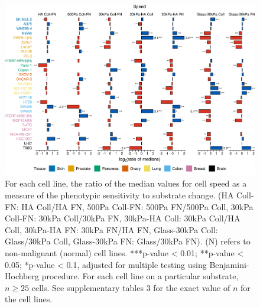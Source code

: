\documentclass[11pt,letterpaper,english,oneside]{article} %
\begin{document}
\begin{figure}[H]
    \centering
    \includegraphics{../Figures/Supplementary_Figure3/supplementary_figure3.png}
    \caption{For each cell line, the ratio of the median values for cell speed as a measure of the phenotypic sensitivity to substrate change. 
    (HA Coll-FN: HA Coll/HA FN, 500Pa Coll-FN: 500Pa FN/500Pa Coll, 30kPa Coll-FN: 30kPa Coll/30kPa FN, 30kPa-HA Coll: 30kPa Coll/HA Coll, 30kPa-HA FN: 30kPa FN/HA FN,
    Glass-30kPa Coll: Glass/30kPa Coll, Glass-30kPa FN: Glass/30kPa FN). (N) refers to non-malignant (normal) cell lines. 
    ***p-value < 0.01; **p-value < 0.05; *p-value < 0.1, adjusted for multiple testing using Benjamini-Hochberg procedure. 
    For each cell line on a particular substrate, $n \geq 25$ cells. 
    See supplementary tables 3 for the exact value of $n$ for the cell lines.}
    \label{fig:fig3}
\end{figure}
\end{document}

